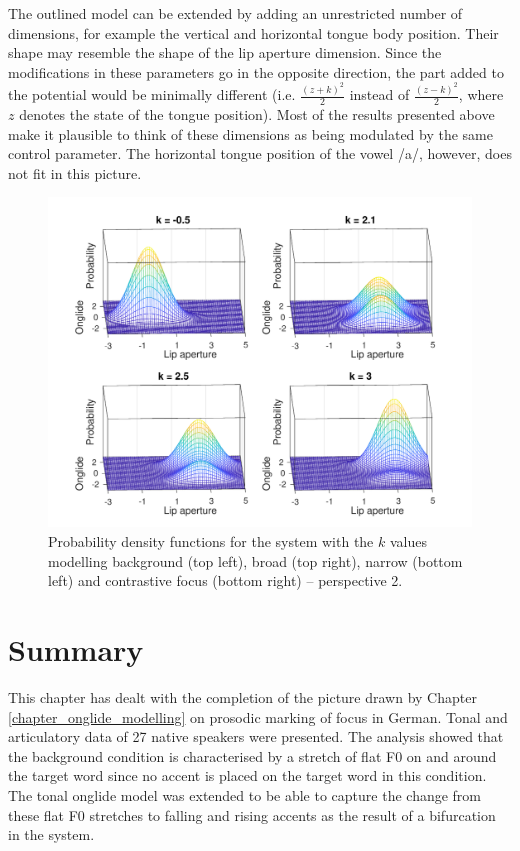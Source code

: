 The outlined model can be extended by adding an unrestricted number of dimensions, for example the vertical and horizontal tongue body position. Their shape may resemble the shape of the lip aperture dimension. Since the modifications in these parameters go in the opposite direction, the part added to the potential would be minimally different (i.e. $\frac{(z+k)^2}{2}$ instead of $\frac{(z-k)^2}{2}$, where $z$ denotes the state of the tongue position). Most of the results presented above make it plausible to think of these dimensions as being modulated by the same control parameter. The horizontal tongue position of the vowel /a/, however, does not fit in this picture.



\begin{figure}[t]
\includegraphics[width=\textwidth]{figures/ch7/probabilities2.pdf}
\caption[Probability density functions for the system with the $k$ values modelling background, broad, narrow and contrastive focus -- perspective 2.]{Probability density functions for the system with the $k$ values modelling background (top left), broad (top right), narrow (bottom left) and contrastive focus (bottom right) -- perspective 2.}
\label{fig:3d_probs2}
\end{figure}

\section{Summary}

This chapter has dealt with the completion of the picture drawn by Chapter \ref{chapter_onglide_modelling} on prosodic marking of focus in German. Tonal and articulatory data of 27 native speakers were presented. The analysis showed that the background condition is characterised by a stretch of flat F0 on and around the target word since no accent is placed on the target word in this condition. The tonal onglide model was extended to be able to capture the change from these flat F0 stretches to falling and rising accents as the result of a bifurcation in the system. 

